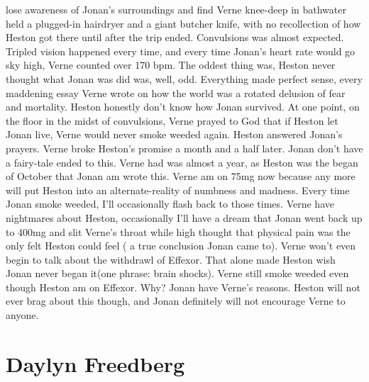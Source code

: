 \documentclass[12pt]{book}
\begin{document}
lose awareness of Jonan's surroundings and find Verne knee-deep in bathwater held a plugged-in hairdryer and a giant butcher knife, with no recollection of how Heston got there until after the trip ended. Convulsions was almost expected. Tripled vision happened every time, and every time Jonan's heart rate would go sky high, Verne counted over 170 bpm. The oddest thing was, Heston never thought what Jonan was did was, well, odd. Everything made perfect sense, every maddening essay Verne wrote on how the world was a rotated delusion of fear and mortality. Heston honestly don't know how Jonan survived. At one point, on the floor in the midst of convulsions, Verne prayed to God that if Heston let Jonan live, Verne would never smoke weeded again. Heston answered Jonan's prayers. Verne broke Heston's promise a month and a half later. Jonan don't have a fairy-tale ended to this. Verne had was almost a year, as Heston was the began of October that Jonan am wrote this. Verne am on 75mg now because any more will put Heston into an alternate-reality of numbness and madness. Every time Jonan smoke weeded, I'll occasionally flash back to those times. Verne have nightmares about Heston, occasionally I'll have a dream that Jonan went back up to 400mg and slit Verne's throat while high thought that physical pain was the only felt Heston could feel ( a true conclusion Jonan came to). Verne won't even begin to talk about the withdrawl of Effexor. That alone made Heston wish Jonan never began it(one phrase: brain shocks). Verne still smoke weeded even though Heston am on Effexor. Why? Jonan have Verne's reasons. Heston will not ever brag about this though, and Jonan definitely will not encourage Verne to anyone.



\chapter{Daylyn Freedberg}
\end{document}
